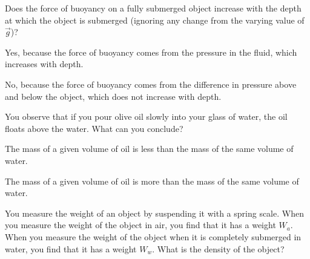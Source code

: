 {{\begin{checkpoint}
\begin{MCquestion}{Does the force of buoyancy on a fully submerged object increase with the depth at which the object is submerged (ignoring any change from the varying value of $\vec g$)?}
\item Yes, because the force of buoyancy comes from the pressure in the fluid, which increases with depth. 
\item No, because the force of buoyancy comes from the difference in pressure above and below the object, which does not increase with depth. \correct
\end{MCquestion}
\end{checkpoint}

\begin{checkpoint}
\begin{MCquestion}{You observe that if you pour olive oil slowly into your glass of water, the oil floats above the water. What can you conclude?}
\item The mass of a given volume of oil is less than the mass of the same volume of water. \correct
\item The mass of a given volume of oil is more than the mass of the same volume of water.  
\end{MCquestion}
\end{checkpoint}

\begin{example}{You measure the weight of an object by suspending it with a spring scale. When you measure the weight of the object in air, you find that it has a weight $W_{a}$. When you measure the weight of the object when it is completely submerged in water, you find that it has a weight $W_w$. What is the density of the object?}


\end{example}}}
